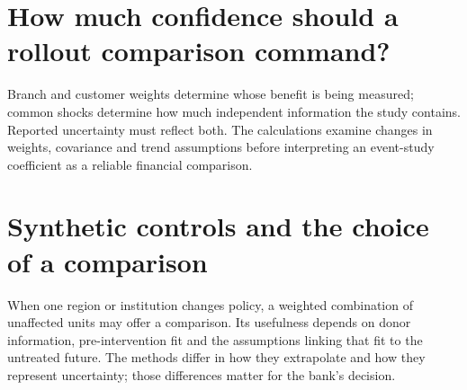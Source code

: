\documentclass[11pt,a4paper,openany]{book}
\begin{document}
























\chapter{How much confidence should a rollout comparison command?}
Branch and customer weights determine whose benefit is being measured;
common shocks determine how much independent information the study contains.
Reported uncertainty must reflect both. The calculations examine changes in
weights, covariance and trend assumptions before interpreting an event-study
coefficient as a reliable financial comparison.




\chapter{Synthetic controls and the choice of a comparison}
When one region or institution changes policy, a weighted combination
of unaffected units may offer a comparison. Its usefulness depends on donor
information, pre-intervention fit and the assumptions linking that fit to the
untreated future. The methods differ in how they extrapolate and how they
represent uncertainty; those differences matter for the bank's decision.
\end{document}
